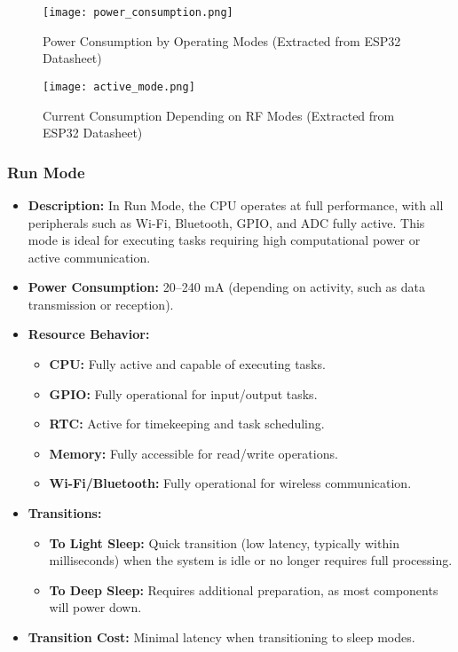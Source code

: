 \documentclass[a4paper, 11pt]{article}
\begin{document}
    \begin{figure}[h!]
    \centering
    \texttt{[image: power\_consumption.png]}
    \caption{Power Consumption by Operating Modes (Extracted from ESP32 Datasheet)}
    \label{fig:power_modes}
    \end{figure}
    
    \begin{figure}[h!]
    \centering
    \texttt{[image: active\_mode.png]}
    \caption{Current Consumption Depending on RF Modes (Extracted from ESP32 Datasheet)}
    \label{fig:rf_modes}
    \end{figure}
    
    \newpage
    \subsubsection*{Run Mode}
    \begin{itemize}
        \item \textbf{Description:} In Run Mode, the CPU operates at full performance, with all peripherals such as Wi-Fi, Bluetooth, GPIO, and ADC fully active. This mode is ideal for executing tasks requiring high computational power or active communication.
        \item \textbf{Power Consumption:} 20–240 mA (depending on activity, such as data transmission or reception).
        \item \textbf{Resource Behavior:}
        \begin{itemize}
            \item \textbf{CPU:} Fully active and capable of executing tasks.
            \item \textbf{GPIO:} Fully operational for input/output tasks.
            \item \textbf{RTC:} Active for timekeeping and task scheduling.
            \item \textbf{Memory:} Fully accessible for read/write operations.
            \item \textbf{Wi-Fi/Bluetooth:} Fully operational for wireless communication.
        \end{itemize}
        \item \textbf{Transitions:}
        \begin{itemize}
            \item \textbf{To Light Sleep:} Quick transition (low latency, typically within milliseconds) when the system is idle or no longer requires full processing.
            \item \textbf{To Deep Sleep:} Requires additional preparation, as most components will power down.
        \end{itemize}
        \item \textbf{Transition Cost:} Minimal latency when transitioning to sleep modes.
    \end{itemize}
    
\end{document}
